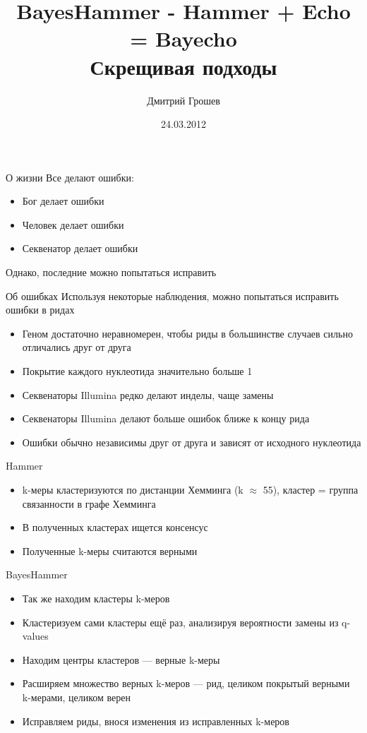 \documentclass{beamer}
\title[Bayecho]{BayesHammer - Hammer + Echo = Bayecho\\Скрещивая подходы}
\author{Дмитрий Грошев}
\date{24.03.2012}
\institute{}
\begin{document}
\begin{frame}
\titlepage
\end{frame}

\begin{frame}{О жизни}
  Все делают ошибки:
  \begin{itemize}
  \item Бог делает ошибки
  \item Человек делает ошибки
  \item Секвенатор делает ошибки
  \end{itemize}
  Однако, последние можно попытаться исправить
\end{frame}

\begin{frame}{Об ошибках}
  Используя некоторые наблюдения, можно попытаться исправить ошибки в ридах
  \begin{itemize}
  \item Геном достаточно неравномерен, чтобы риды в большинстве случаев сильно отличались друг от друга
  \item Покрытие каждого нуклеотида значительно больше 1
  \item Секвенаторы Illumina редко делают инделы, чаще замены
  \item Секвенаторы Illumina делают больше ошибок ближе к концу рида
  \item Ошибки обычно независимы друг от друга и зависят от исходного нуклеотида
  \end{itemize}
\end{frame}

\begin{frame}{Hammer}
  \begin{itemize}
  \item k-меры кластеризуются по дистанции Хемминга (k $\approx$ 55), кластер = группа связанности в графе Хемминга
  \item В полученных кластерах ищется консенсус
  \item Полученные k-меры считаются верными
  \end{itemize}
\end{frame}

\begin{frame}{BayesHammer}
  \begin{itemize}
  \item Так же находим кластеры k-меров
  \item Кластеризуем сами кластеры ещё раз, анализируя вероятности замены из q-values
  \item Находим центры кластеров — верные k-меры
  \item Расширяем множество верных k-меров — рид, целиком покрытый верными k-мерами, целиком верен
  \item Исправляем риды, внося изменения из исправленных k-меров
  \end{itemize}
\end{frame}
\end{document}
